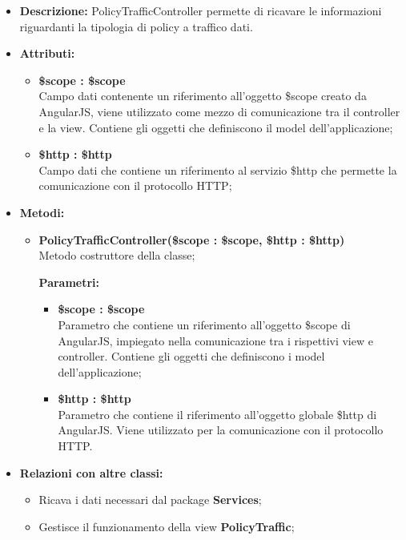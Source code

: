 \begin{itemize}
	\item \textbf{Descrizione:} PolicyTrafficController permette di ricavare le informazioni riguardanti la tipologia di policy a traffico dati.
	\item \textbf{Attributi:}
	\begin{itemize}
		
		\item \textbf{\$scope : \$scope}\\
		Campo dati contenente un riferimento all'oggetto \$scope creato da AngularJS, viene utilizzato come mezzo di comunicazione tra il controller e la view. Contiene gli oggetti che definiscono il model dell'applicazione;
		
		\item \textbf{\$http : \$http }\\
		Campo dati che contiene un riferimento al servizio \$http che permette la comunicazione con il protocollo HTTP;
		
	\end{itemize}
	\item \textbf{Metodi:}
	\begin{itemize}
		
		\item \textbf{PolicyTrafficController(\$scope : \$scope, \$http : \$http)}\\
		Metodo costruttore della classe;
		\begin{description}
			\item[\textbf{Parametri:}]
		\end{description}
		\begin{itemize}
			\item \textbf{\$scope : \$scope}\\
			Parametro che contiene un riferimento all'oggetto \$scope di AngularJS, impiegato nella comunicazione tra i rispettivi view e controller. Contiene gli oggetti che definiscono i model dell'applicazione;
			
			\item \textbf{\$http : \$http}\\
			Parametro che contiene il riferimento all'oggetto globale \$http di AngularJS. Viene utilizzato per la comunicazione con il protocollo HTTP.
			
		\end{itemize}				
	\end{itemize}
	\item \textbf{Relazioni con altre classi:}
	\begin{itemize}
		\item Ricava i dati necessari dal package \textbf{Services};
		\item Gestisce il funzionamento della view \textbf{PolicyTraffic};
	\end{itemize}
\end{itemize}

